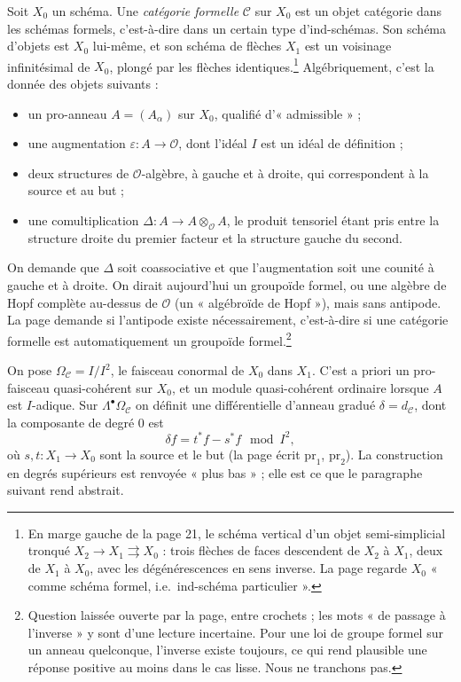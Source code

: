 \documentclass[11pt,a4paper]{article}
\begin{document}
Soit $X_0$ un schéma. Une \emph{catégorie formelle} $\mathcal{C}$ sur $X_0$ est
un objet catégorie dans les schémas formels, c'est-à-dire dans un certain type
d'ind-schémas. Son schéma d'objets est $X_0$ lui-même, et son schéma de flèches
$X_1$ est un voisinage infinitésimal de $X_0$, plongé par les flèches
identiques.\footnote{En marge gauche de la page 21, le schéma vertical d'un objet
semi-simplicial tronqué $X_2 \to X_1 \rightrightarrows X_0$ : trois flèches de
faces descendent de $X_2$ à $X_1$, deux de $X_1$ à $X_0$, avec les
dégénérescences en sens inverse. La page regarde $X_0$ « comme schéma formel,
i.e.\ ind-schéma particulier ».} Algébriquement, c'est la donnée des objets
suivants :
\begin{itemize}
  \item un pro-anneau $A = (A_\alpha)$ sur $X_0$, qualifié d'« admissible » ;
  \item une augmentation $\varepsilon : A \to \mathcal{O}$, dont l'idéal $I$
  est un idéal de définition ;
  \item deux structures de $\mathcal{O}$-algèbre, à gauche et à droite, qui
  correspondent à la source et au but ;
  \item une comultiplication $\Delta : A \to A \otimes_{\mathcal{O}} A$, le
  produit tensoriel étant pris entre la structure droite du premier facteur et
  la structure gauche du second.
\end{itemize}
On demande que $\Delta$ soit coassociative et que l'augmentation soit une
counité à gauche et à droite. On dirait aujourd'hui un groupoïde formel, ou
une algèbre de Hopf complète au-dessus de $\mathcal{O}$ (un « algébroïde de
Hopf »), mais sans antipode. La page demande si l'antipode existe
nécessairement, c'est-à-dire si une catégorie formelle est automatiquement un
groupoïde formel.\footnote{Question laissée ouverte par la page, entre
crochets ; les mots « de passage à l'inverse » y sont d'une lecture incertaine.
Pour une loi de groupe formel sur un anneau quelconque, l'inverse existe
toujours, ce qui rend plausible une réponse positive au moins dans le cas lisse.
Nous ne tranchons pas.}

On pose $\Omega_{\mathcal{C}} = I/I^{2}$, le faisceau conormal de $X_0$ dans
$X_1$. C'est a priori un pro-faisceau quasi-cohérent sur $X_0$, et un module
quasi-cohérent ordinaire lorsque $A$ est $I$-adique. Sur
$\Lambda^{\bullet}\Omega_{\mathcal{C}}$ on définit une différentielle d'anneau
gradué $\delta = d_{\mathcal{C}}$, dont la composante de degré 0 est
\[
\delta f = t^{*}f - s^{*}f \mod I^{2},
\]
où $s, t : X_1 \to X_0$ sont la source et le but (la page écrit
$\mathrm{pr}_1$, $\mathrm{pr}_2$). La construction en degrés supérieurs est
renvoyée « plus bas » ; elle est ce que le paragraphe suivant rend abstrait.
\end{document}
